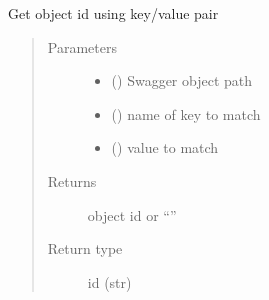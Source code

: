 \documentclass[letterpaper,10pt,english]{sphinxmanual}
\begin{document}
\begin{fulllineitems}

\begin{fulllineitems}
\label{\detokenize{b1tddfp-class:bloxone.b1tddfp.get_id}}
\sphinxAtStartPar
Get object id using key/value pair
\begin{quote}\begin{description}
\item[{Parameters}] \leavevmode\begin{itemize}
\item {} 
\sphinxAtStartPar
{} () \textendash{} Swagger object path

\item {} 
\sphinxAtStartPar
{} () \textendash{} name of key to match

\item {} 
\sphinxAtStartPar
{} () \textendash{} value to match

\end{itemize}

\item[{Returns}] \leavevmode
\sphinxAtStartPar
object id or “”

\item[{Return type}] \leavevmode
\sphinxAtStartPar
id (str)

\end{description}\end{quote}

\end{fulllineitems}



\end{fulllineitems}
\end{document}
